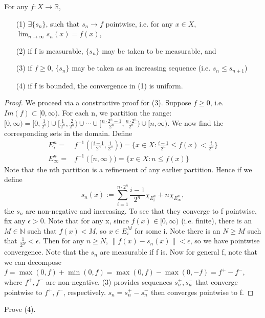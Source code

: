 \documentclass[11pt]{scrartcl}
\begin{document}
\begin{theorem}
For any $f: X \rightarrow \mathbb{R}$,
\begin{itemize}
\item[(1)] $\exists \{s_n\}$, such that $s_n \rightarrow f $ pointwise, i.e. for any $x \in X$, $\lim_{n \rightarrow \infty} s_n(x) = f(x)$,
\item[(2)] if f is measurable, $\{s_n\}$ may be taken to be measurable, and
\item[(3)] if $f \geq 0$, $\{s_n\}$ may be taken as an increasing sequence (i.e. $s_n \leq s_{n+1}$)
\item[(4)] if f is bounded, the convergence in (1) is uniform.
\end{itemize}
\end{theorem}

\begin{proof}
We proceed via a constructive proof for (3). Suppose $f\geq 0$, i.e. $Im(f) \subset [0,\infty)$. For each n, we partition the range: $[0,\infty) = [0,\frac{1}{2^n})\cup [\frac{1}{2^n},\frac{2}{2^n}) \cup \cdots \cup [\frac{n\cdot 2^n -1}{2^n},\frac{n\cdot 2^n}{2^n})\cup [n,\infty)$. We now find the corresponding sets in the domain. Define
\begin{align*}
E_i^n =& f^{-1}([\frac{i-1}{2^n},\frac{i}{2^n})) = \{x\in X: \frac{i-1}{2^n}\leq f(x) < \frac{i}{2^n}\}\\
E_\infty^n = & f^{-1}([n,\infty)) = \{x\in X: n \leq f(x)\}
\end{align*}
Note that the nth partition is a refinement of any earlier partition. Hence if we define 
$$ s_n(x) := \sum_{i=1}^{n\cdot 2^n} \frac{i-1}{2^n} \chi_{E_i^n} + n \chi_{E_\infty^n},$$
the $s_n$ are non-negative and increasing. To see that they converge to f pointwise, fix any $\epsilon>0$. Note that for any x, since $f(x)\in[0,\infty)$ (i.e. finite), there is an $M \in \mathbb{N}$ such that $f(x) < M$, so $x\in E_i^M$ for some i. Note there is an $N\geq M$ such that $\frac{1}{2^N}<\epsilon$. Then for any $n\geq N$, $\|f(x)-s_n(x)\|<\epsilon$, so we have pointwise convergence.
Note that the $s_n$ are measurable if f is.
Now for general f, note that we can decompose $f = \max(0,f) + \min(0,f)= \max(0,f) - \max(0,-f) = f^+ - f^- $, where $f^+,f^-$ are non-negative. (3) provides sequences $s_n^+,s_n^-$ that converge pointwise to $f^+,f^-$, respectively. $s_n = s_n^+ - s_n^-$ then converges pointwise to f. 
\end{proof} 

\begin{exercise}
Prove (4).
\end{exercise}
\end{document}
